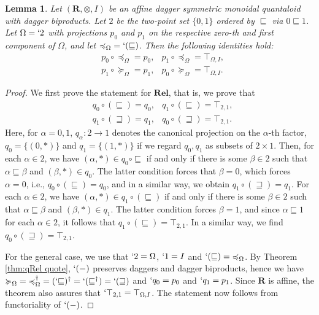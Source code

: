 \documentclass[12pt]{tac}
\newtheorem{lemma}[theorem]{Lemma}
\theoremstyle{definition}
\theoremstyle{remark}
\newcommand{\qo}{{\boldsymbol{\preccurlyeq}}}
\newcommand{\qop}{{\boldsymbol{\succcurlyeq}}}
\newcommand{\<}{\langle}
\renewcommand{\>}{\rangle}
\renewcommand{\:}{\colon}
\begin{document}
\begin{lemma}\label{lem:eval-identities}
Let $(\mathbf R,\otimes,I)$ be an affine dagger symmetric monoidal quantaloid with dagger biproducts. Let $2$ be the two-point set $\{0,1\}$ ordered by $\sqsubseteq$ via $0\sqsubseteq 1$. Let $\Omega=`2$ with projections $p_0$ and $p_1$ on the respective zero-th and first component of $\Omega$, and let $\qo_\Omega=`(\sqsubseteq)$. 
Then the following identities hold:
\begin{align*}
& p_0\circ \qo_\Omega   = p_0, &p_1\circ \qo_\Omega  = \top_{\Omega,I},\\    
       &  p_1\circ \qop_\Omega = p_1, &
    p_0\circ \qop_\Omega  = \top_{\Omega,I}.
        \end{align*}
\end{lemma}
\begin{proof}

We first prove the statement for $\mathbf{Rel}$, that is, we prove that
\begin{align*}
& q_0\circ (\sqsubseteq)  = q_0,
 &   q_1\circ (\sqsubseteq)  = \top_{2,1},\\    
       & q_1\circ (\sqsupseteq)  = q_1, & 
    q_0\circ (\sqsupseteq) = \top_{2,1}.
        \end{align*}
Here, for $\alpha=0,1$, $q_\alpha:2\to 1$ denotes the canonical projection on the $\alpha$-th factor, $q_0=\{(0,*)\}$ and $q_1=\{(1,*)\}$ if we regard $q_0,q_1$ as subsets of $2\times 1$.
Then, for each $\alpha\in 2$, we have $(\alpha,*)\in q_0\circ\sqsubseteq$ if and only if there is some $\beta\in 2$ such that $\alpha\sqsubseteq\beta$ and $(\beta,*)\in q_0$. The latter condition forces that $\beta=0$, which forces $\alpha=0$, i.e., $q_0\circ(\sqsubseteq)=q_0$, and in a similar way, we obtain $q_1\circ(\sqsupseteq)=q_1$. For each $\alpha\in 2$, we have $(\alpha,*)\in q_1\circ(\sqsubseteq)$ if and only if there is some $\beta\in 2$ such that $\alpha\sqsubseteq\beta$ and $(\beta,*)\in q_1$. The latter condition forces $\beta=1$, and since $\alpha\sqsubseteq 1$ for each $\alpha\in 2$, it follows that $q_1\circ(\sqsubseteq)=\top_{2,1}$. In a similar way, we find $q_0\circ(\sqsupseteq)=\top_{2,1}$.

For the general case, we use that $`2=\Omega$, $`1=I$ and $`(\sqsubseteq)=\qo_\Omega$. By Theorem \ref{thm:qRel quote}, $`(-)$ preserves daggers and dagger biproducts, hence we have $\qop_\Omega=\qo_\Omega^\dag=(`{\sqsubseteq})^\dag=`(\sqsubseteq^\dag)=`(\sqsupseteq)$ and $`q_0=p_0$ and $`q_1=p_1$. Since $\mathbf R$ is affine, the theorem also assures that $`\top_{2,1}=\top_{\Omega,I}$. The statement now follows from functoriality of $`(-)$.
\end{proof}
\end{document}
